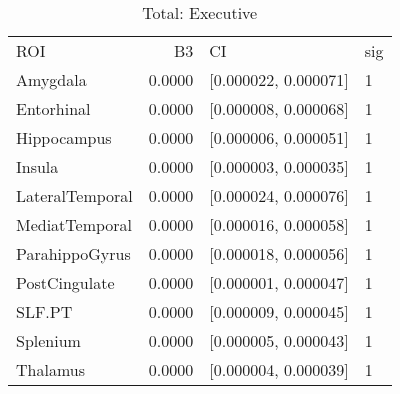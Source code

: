 \documentclass{article}
\begin{document}
\begin{table}[H]
\centering
\caption{Total: Executive} 
\begin{tabular}{lrll}
  \toprule
ROI & B3 & CI & sig \\ 
  \rowcolor{orange!30} \midrule
Amygdala & 0.0000 & [0.000022, 0.000071] & 1 \\ 
   \rowcolor{orange!30}Entorhinal & 0.0000 & [0.000008, 0.000068] & 1 \\ 
   \rowcolor{orange!30}Hippocampus & 0.0000 & [0.000006, 0.000051] & 1 \\ 
   \rowcolor{orange!30}Insula & 0.0000 & [0.000003, 0.000035] & 1 \\ 
   \rowcolor{orange!30}LateralTemporal & 0.0000 & [0.000024, 0.000076] & 1 \\ 
   \rowcolor{orange!30}MediatTemporal & 0.0000 & [0.000016, 0.000058] & 1 \\ 
   \rowcolor{orange!30}ParahippoGyrus & 0.0000 & [0.000018, 0.000056] & 1 \\ 
   \rowcolor{orange!30}PostCingulate & 0.0000 & [0.000001, 0.000047] & 1 \\ 
   \rowcolor{orange!30}SLF.PT & 0.0000 & [0.000009, 0.000045] & 1 \\ 
   \rowcolor{orange!30}Splenium & 0.0000 & [0.000005, 0.000043] & 1 \\ 
   \rowcolor{orange!30}Thalamus & 0.0000 & [0.000004, 0.000039] & 1 \\ 
   \bottomrule
\end{tabular}
\end{table}%
\end{document}
